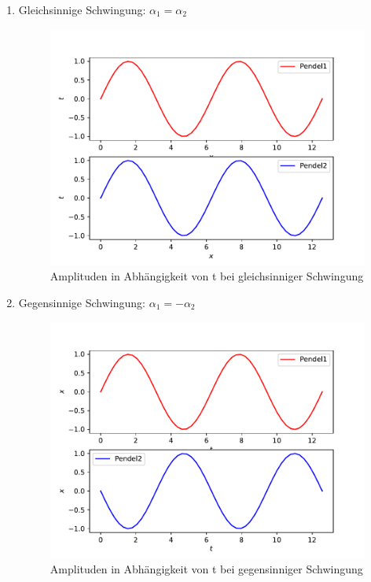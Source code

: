 \begin{enumerate}
    \item Gleichsinnige Schwingung: $\alpha_1=\alpha_2$
        \begin{figure}
        \centering
        \includegraphics[scale = 0.5]{gleichsinnig.pdf}
        \caption{Amplituden in Abhängigkeit von t bei gleichsinniger Schwingung}
        \label{fig:gleichsinnig}
      \end{figure}
    \item Gegensinnige Schwingung: $\alpha_1=-\alpha_2$
    \begin{figure}
        \centering
        \includegraphics[scale = 0.5]{gegensinnig.pdf}
        \caption{Amplituden in Abhängigkeit von t bei gegensinniger Schwingung}

\end{figure}
\end{enumerate}

